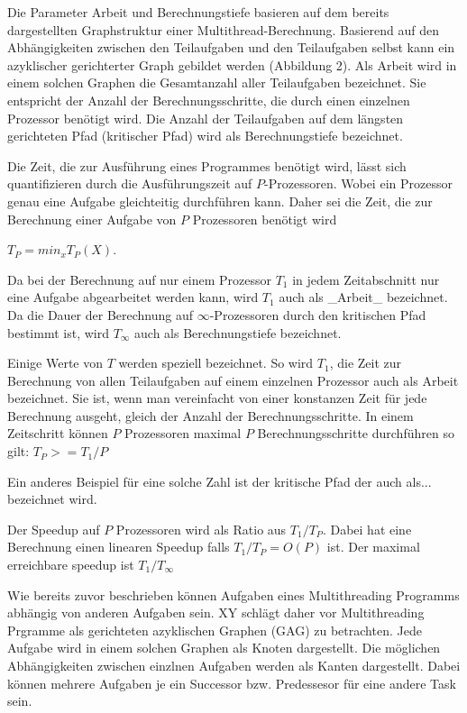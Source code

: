 Die Parameter Arbeit und Berechnungstiefe basieren auf dem bereits dargestellten Graphstruktur einer Multithread-Berechnung. Basierend auf den Abhängigkeiten zwischen den Teilaufgaben und den Teilaufgaben selbst kann ein azyklischer gerichterter Graph gebildet werden (Abbildung 2). Als Arbeit wird in einem solchen Graphen die Gesamtanzahl aller Teilaufgaben bezeichnet. Sie entspricht der Anzahl der Berechnungsschritte, die durch einen einzelnen Prozessor benötigt wird. Die Anzahl der Teilaufgaben auf dem längsten gerichteten Pfad (kritischer Pfad) wird als Berechnungstiefe bezeichnet.

Die Zeit, die zur Ausführung eines Programmes benötigt wird, lässt sich quantifizieren durch die Ausführungszeit auf $P$-Prozessoren. Wobei ein Prozessor genau eine Aufgabe gleichteitig durchführen kann. Daher sei die Zeit, die zur Berechnung einer Aufgabe von $P$ Prozessoren benötigt wird

$T_P = min_x T_P(X)$.

Da bei der Berechnung auf nur einem Prozessor $T_1$ in jedem Zeitabschnitt nur eine Aufgabe abgearbeitet werden kann, wird $T_1$ auch als _Arbeit_ bezeichnet. Da die Dauer der Berechnung auf $\infty$-Prozessoren durch den kritischen Pfad bestimmt ist, wird $T_\infty$ auch als Berechnungstiefe bezeichnet.

Einige Werte von $T$ werden speziell bezeichnet. So wird $T_1$, die Zeit zur Berechnung von allen Teilaufgaben auf einem einzelnen Prozessor auch als Arbeit bezeichnet. Sie ist, wenn man vereinfacht von einer konstanzen Zeit für jede Berechnung ausgeht, gleich der Anzahl der Berechnungsschritte. In einem Zeitschritt können $P$ Prozessoren maximal $P$ Berechnungsschritte durchführen so gilt: $T_P >= T_1/P$


Ein anderes Beispiel für eine solche Zahl ist der kritische Pfad der auch als... bezeichnet wird.


Der Speedup auf $P$ Prozessoren wird als Ratio aus $T_1/T_P$. Dabei hat eine Berechnung einen linearen Speedup falls $T_1/T_P = O(P)$ ist. Der maximal erreichbare speedup ist $T_1/T_\infty$




Wie bereits zuvor beschrieben können Aufgaben eines Multithreading Programms abhängig von anderen Aufgaben sein. XY schlägt daher vor Multithreading Prgramme als gerichteten azyklischen Graphen (GAG) zu betrachten. Jede Aufgabe wird in einem solchen Graphen als Knoten dargestellt. Die möglichen Abhängigkeiten zwischen einzlnen Aufgaben werden als Kanten dargestellt. Dabei können mehrere Aufgaben je ein Successor bzw. Predessesor für eine andere Task sein.

